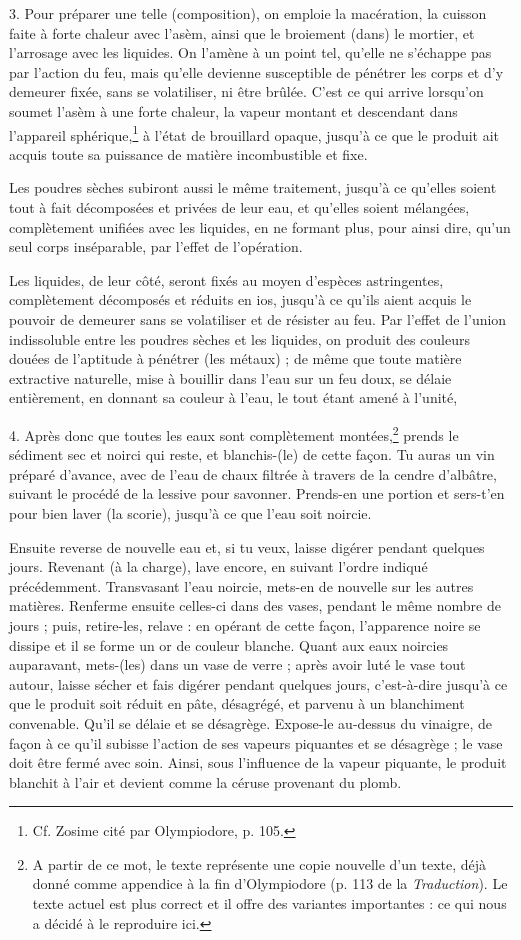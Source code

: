 \documentclass[a4paper, 11pt, oneside, polutonikogreek, french]{article}
\begin{document}
3. Pour préparer une telle (composition), on emploie la macération, la cuisson faite à forte chaleur avec l'asèm, ainsi que le broiement (dans) le mortier, et l'arrosage avec les liquides. On l'amène à un point tel, qu'elle ne s'échappe pas par l'action du feu, mais qu'elle devienne susceptible de pénétrer les corps et d'y demeurer fixée, sans se volatiliser, ni être brûlée. C'est ce qui arrive lorsqu'on soumet l'asèm à une forte chaleur, la vapeur montant et descendant dans l'appareil sphérique,\footnote{Cf. Zosime cité par Olympiodore, p. 105.} à l'état de brouillard opaque, jusqu'à ce que le produit ait acquis toute sa puissance de matière incombustible et fixe.

Les poudres sèches subiront aussi le même traitement, jusqu'à ce qu'elles soient tout à fait décomposées et privées de leur eau, et qu'elles soient mélangées, complètement unifiées avec les liquides, en ne formant plus, pour ainsi dire, qu'un seul corps inséparable, par l'effet de l'opération.

Les liquides, de leur côté, seront fixés au moyen d'espèces astringentes, complètement décomposés et réduits en ios, jusqu'à ce qu'ils aient acquis le pouvoir de demeurer sans se volatiliser et de résister au feu. Par l'effet de l'union indissoluble entre les poudres sèches et les liquides, on produit des couleurs douées de l'aptitude à pénétrer (les métaux) ; de même que toute matière extractive naturelle, mise à bouillir dans l'eau sur un feu doux, se délaie entièrement, en donnant sa couleur à l'eau, le tout étant amené à l'unité,

4. Après donc que toutes les eaux sont complètement montées,\footnote{A partir de ce mot, le texte représente une copie nouvelle d'un texte, déjà donné comme appendice à la fin d'Olympiodore (p. 113 de la \emph{Traduction}). Le texte actuel est plus correct et il offre des variantes importantes : ce qui nous a décidé à le reproduire ici.} prends le sédiment sec et noirci qui reste, et blanchis-(le) de cette façon. Tu auras un vin préparé d'avance, avec de l'eau de chaux filtrée à travers de la cendre d'albâtre, suivant le procédé de la lessive pour savonner. Prends-en une portion et sers-t'en pour bien laver (la scorie), jusqu'à ce que l'eau soit noircie.

Ensuite reverse de nouvelle eau et, si tu veux, laisse digérer pendant quelques jours. Revenant (à la charge), lave encore, en suivant l'ordre indiqué précédemment. Transvasant l'eau noircie, mets-en de nouvelle sur les autres matières. Renferme ensuite celles-ci dans des vases, pendant le même nombre de jours ; puis, retire-les, relave : en opérant de cette façon, l'apparence noire se dissipe et il se forme un or de couleur blanche. Quant aux eaux noircies auparavant, mets-(les) dans un vase de verre ; après avoir luté le vase tout autour, laisse sécher et fais digérer pendant quelques jours, c'est-à-dire jusqu'à ce que le produit soit réduit en pâte, désagrégé, et parvenu à un blanchiment convenable. Qu'il se délaie et se désagrège. Expose-le au-dessus du vinaigre, de façon à ce qu'il subisse l'action de ses vapeurs piquantes et se désagrège ; le vase doit être fermé avec soin. Ainsi, sous l'influence de la vapeur piquante, le produit blanchit à l'air et devient comme la céruse provenant du plomb.
\end{document}

